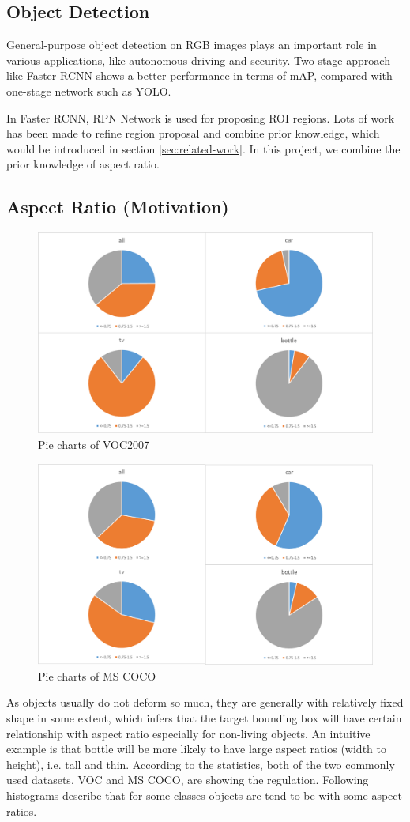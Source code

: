 \documentclass[10pt,twocolumn,letterpaper]{article}
\begin{document}
\subsection{Object Detection}
\par
General-purpose object detection on RGB images plays an important role in various applications, like autonomous driving and security. Two-stage approach like Faster RCNN \cite{fasterRCNN} shows a better performance in terms of mAP, compared with one-stage network such as YOLO.
\par
In Faster RCNN, RPN Network is used for proposing ROI regions. Lots of work has been made to refine region proposal and combine prior knowledge, which would be introduced in section \ref{sec:related-work}. In this project, we combine the prior knowledge of aspect ratio.

\subsection{Aspect Ratio (Motivation)}
\begin{figure}[h]
\centering
\includegraphics[width=0.7\linewidth]{pic/dist_pics/o_piescoc}
\caption{Pie charts of VOC2007}
\label{fig:piesvoc}
\end{figure}

\begin{figure}[h]
\centering
\includegraphics[width=0.7\linewidth]{pic/dist_pics/pies_coco}
\caption{Pie charts of MS COCO}
\label{fig:piescoco}
\end{figure}
As objects usually do not deform so much, they are generally with relatively fixed shape in some extent, which infers that the target bounding box will have certain relationship with aspect ratio especially for non-living objects. An intuitive example is that bottle will be more likely to have large aspect ratios (width to height), i.e. tall and thin. According to the statistics, both of the two commonly used datasets, VOC and MS COCO, are showing the regulation. Following histograms describe that for some classes objects are tend to be with some aspect ratios. 
\end{document}
